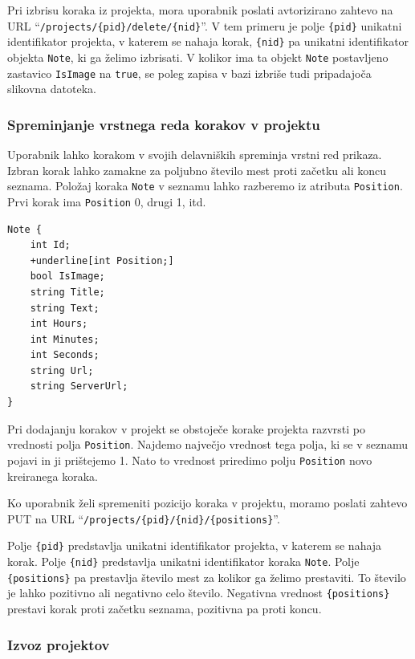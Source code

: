 \documentclass[a4paper, 12pt]{book}
\begin{document}
Pri izbrisu koraka iz projekta, mora uporabnik poslati avtorizirano zahtevo na URL \enquote{\texttt{/projects/\{pid\}/delete/\{nid\}}}.
V tem primeru je polje \texttt{\{pid\}} unikatni identifikator projekta, v katerem se nahaja korak, \texttt{\{nid\}} pa unikatni identifikator objekta \texttt{Note}, ki ga želimo izbrisati.
V kolikor ima ta objekt \texttt{Note} postavljeno zastavico \texttt{IsImage} na \texttt{true}, se poleg zapisa v bazi izbriše tudi pripadajoča slikovna datoteka.


\subsubsection{Spreminjanje vrstnega reda korakov v projektu}

Uporabnik lahko korakom v svojih delavniških spreminja vrstni red prikaza.
Izbran korak lahko zamakne za poljubno število mest proti začetku ali koncu seznama.
Položaj koraka \texttt{Note} v seznamu lahko razberemo iz atributa \texttt{Position}.
Prvi korak ima \texttt{Position} 0, drugi 1, itd.

\begin{Verbatim}[commandchars=+\[\]]
Note { 
    int Id; 
    +underline[int Position;]
    bool IsImage;  
    string Title; 
    string Text;
    int Hours; 
    int Minutes;
    int Seconds;
    string Url;
    string ServerUrl;
}
\end{Verbatim}

Pri dodajanju korakov v projekt se obstoječe korake projekta razvrsti po vrednosti polja \texttt{Position}.
Najdemo največjo vrednost tega polja, ki se v seznamu pojavi in ji prištejemo 1.
Nato to vrednost priredimo polju \texttt{Position} novo kreiranega koraka.

Ko uporabnik želi spremeniti pozicijo koraka v projektu, moramo poslati zahtevo PUT na URL \enquote{\texttt{/projects/\{pid\}/\{nid\}/\{positions\}}}.

Polje \texttt{\{pid\}} predstavlja unikatni identifikator projekta, v katerem se nahaja korak.
Polje \texttt{\{nid\}} predstavlja unikatni identifikator koraka \texttt{Note}.
Polje \texttt{\{positions\}} pa prestavlja število mest za kolikor ga želimo prestaviti.
To število je lahko pozitivno ali negativno celo število.
Negativna vrednost \texttt{\{positions\}} prestavi korak proti začetku seznama, pozitivna pa proti koncu.

\subsubsection{Izvoz projektov}
\end{document}
